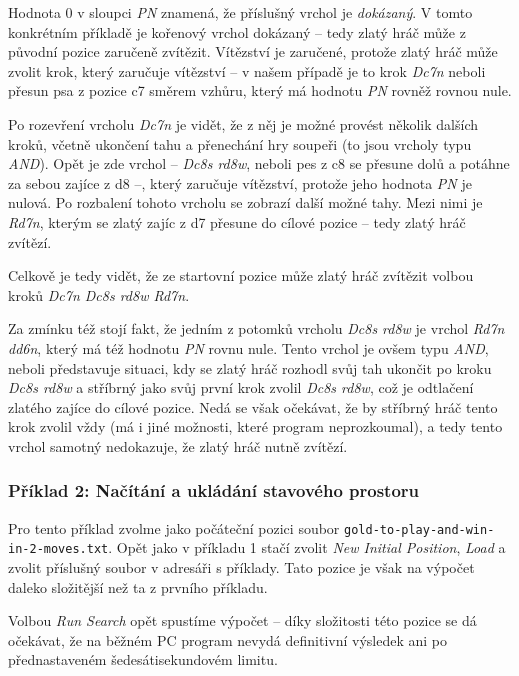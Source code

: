 \documentclass{article}
\begin{document}
Hodnota 0 v sloupci \emph{PN} znamená, že příslušný vrchol je \emph{dokázaný}. V tomto konkrétním příkladě je kořenový
vrchol dokázaný -- tedy zlatý hráč může z původní pozice zaručeně zvítězit. Vítězství je zaručené, protože zlatý hráč
může zvolit krok, který zaručuje vítězství -- v našem případě je to krok \emph{Dc7n} neboli přesun psa z pozice c7
směrem vzhůru, který má hodnotu \emph{PN} rovněž rovnou nule.

Po rozevření vrcholu \emph{Dc7n} je vidět, že z něj je možné provést několik dalších kroků, včetně ukončení tahu a
přenechání hry soupeři (to jsou vrcholy typu \emph{AND}). Opět je zde vrchol -- \emph{Dc8s rd8w}, neboli pes z c8 se
přesune dolů a potáhne za sebou zajíce z d8 --, který zaručuje vítězství, protože jeho hodnota \emph{PN} je nulová. Po
rozbalení tohoto vrcholu se zobrazí další možné tahy. Mezi nimi je \emph{Rd7n}, kterým se zlatý zajíc z d7 přesune do
cílové pozice -- tedy zlatý hráč zvítězí.

Celkově je tedy vidět, že ze startovní pozice může zlatý hráč zvítězit volbou kroků \emph{Dc7n Dc8s rd8w Rd7n}.

Za zmínku též stojí fakt, že jedním z potomků vrcholu \emph{Dc8s rd8w} je vrchol \emph{Rd7n dd6n}, který má též hodnotu
\emph{PN} rovnu nule. Tento vrchol je ovšem typu \emph{AND}, neboli představuje situaci, kdy se zlatý hráč rozhodl svůj
tah ukončit po kroku \emph{Dc8s rd8w} a stříbrný jako svůj první krok zvolil \emph{Dc8s rd8w}, což je odtlačení zlatého
zajíce do cílové pozice. Nedá se však očekávat, že by stříbrný hráč tento krok zvolil vždy (má i jiné možnosti, které
program neprozkoumal), a tedy tento vrchol samotný nedokazuje, že zlatý hráč nutně zvítězí.

\subsubsection{Příklad 2: Načítání a ukládání stavového prostoru}
\label{sec:gui-example-2}
Pro tento příklad zvolme jako počáteční pozici soubor \texttt{gold-to-play-and-win-in-2-moves.txt}. Opět jako v příkladu
1 stačí zvolit \emph{New Initial Position}, \emph{Load} a zvolit příslušný soubor v adresáři s příklady. Tato pozice je
však na výpočet daleko složitější než ta z prvního příkladu.

Volbou \emph{Run Search} opět spustíme výpočet -- díky složitosti této pozice se dá očekávat, že na běžném PC program
nevydá definitivní výsledek ani po přednastaveném šedesátisekundovém limitu.
\end{document}
